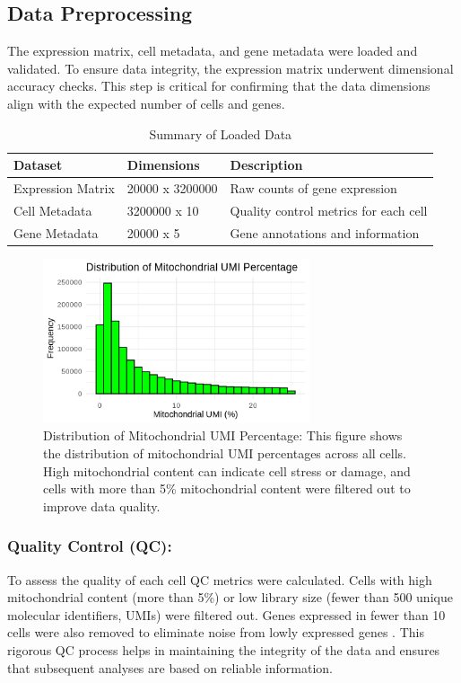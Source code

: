 \documentclass[runningheads]{llncs}
\begin{document}
\subsection*{Data Preprocessing}
The expression matrix, cell metadata, and gene metadata were loaded and validated. To ensure data integrity, the expression matrix underwent dimensional accuracy checks. This step is critical for confirming that the data dimensions align with the expected number of cells and genes.

\begin{table}
    \centering
    \begin{tabular}{|l|l|l|}
        \hline
        \textbf{Dataset} & \textbf{Dimensions} & \textbf{Description} \\
        \hline
        Expression Matrix & 20000 x 3200000 & Raw counts of gene expression \\
        \hline
        Cell Metadata & 3200000 x 10 & Quality control metrics for each cell \\
        \hline
        Gene Metadata & 20000 x 5 & Gene annotations and information \\
        \hline
    \end{tabular}
    \caption{Summary of Loaded Data}
    \label{tab:my_label}
\end{table}


\begin{figure}[H]
  \centering
  \includegraphics[height=0.2\textheight, width=0.7\textwidth]{000018.png}
  \caption{Distribution of Mitochondrial UMI Percentage: This figure shows the distribution of mitochondrial UMI percentages across all cells. High mitochondrial content can indicate cell stress or damage, and cells with more than 5\% mitochondrial content were filtered out to improve data quality.}
  \label{fig:mito_umi_percent}
\end{figure}

\subsubsection{Quality Control (QC):} To assess the quality of each cell QC metrics were calculated. Cells with high mitochondrial content (more than 5\%) or low library size (fewer than 500 unique molecular identifiers, UMIs) were filtered out. Genes expressed in fewer than 10 cells were also removed to eliminate noise from lowly expressed genes \cite{phipson2022propeller}. This rigorous QC process helps in maintaining the integrity of the data and ensures that subsequent analyses are based on reliable information.
\end{document}
